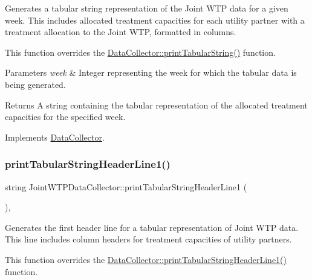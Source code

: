 Generates a tabular string representation of the Joint W\+TP data for a given week. This includes allocated treatment capacities for each utility partner with a treatment allocation to the Joint W\+TP, formatted in columns. 

This function overrides the \mbox{\hyperlink{classDataCollector_a397fccabe0223267eea8fc7cac0e59da}{Data\+Collector\+::print\+Tabular\+String()}} function.


\begin{DoxyParams}{Parameters}
{\em week} & Integer representing the week for which the tabular data is being generated.\\
\hline
\end{DoxyParams}
\begin{DoxyReturn}{Returns}
A string containing the tabular representation of the allocated treatment capacities for the specified week. 
\end{DoxyReturn}


Implements \mbox{\hyperlink{classDataCollector_a397fccabe0223267eea8fc7cac0e59da}{Data\+Collector}}.

\mbox{\label{classJointWTPDataCollector_a6b9ba2992f4a9c3a900ad675b8301d07}} 
\subsubsection{\texorpdfstring{print\+Tabular\+String\+Header\+Line1()}{printTabularStringHeaderLine1()}}
{\footnotesize\ttfamily string Joint\+W\+T\+P\+Data\+Collector\+::print\+Tabular\+String\+Header\+Line1 (\begin{DoxyParamCaption}{ }\end{DoxyParamCaption})\hspace{0.3cm}{\ttfamily [override]}, {\ttfamily [virtual]}}



Generates the first header line for a tabular representation of Joint W\+TP data. This line includes column headers for treatment capacities of utility partners. 

This function overrides the \mbox{\hyperlink{classDataCollector_a91619cfa9e9b8cefd2f7c20d5718b41e}{Data\+Collector\+::print\+Tabular\+String\+Header\+Line1()}} function.

